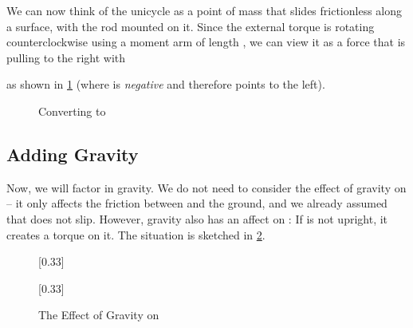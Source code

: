 \documentclass[copyright,submission]{eptcs}
\newcommand{\surface}{
    \begin{scope}[transparency group]
        \clip (-2,0) rectangle (2,-1);
        \draw[scope fading=south] (-2,0) rectangle (2,-1);
        \foreach \x in {-2,-1.75,...,3}
            \draw (\x,0) -- ();
    \end{scope}
}
\newcommand{\wheel}{
    \draw (0, 1) circle (1);
    \draw[fill] (0, 1) circle (0.05);
}
\newcommand{\saddle}[1][110]{
    \draw (0, 1) -- ([shift=(#1:3)] 0,1);
    \draw[fill] ([shift=(#1:0)] 0,1) circle (0.05);
    \draw[fill] ([shift=(#1:2)] 0,1) circle (0.03);
    \draw[fill] ([shift=(#1:3)] 0,1) circle (0.05);
}
\newcommand{\angletheta}[1][110]{
    \draw[dashed] (0, 1) -- (0, 3);
    \draw[dashed] ([shift=(90:1.5)] 0,1) arc (90:#1:1.5) node [midway, below] {};
}
\begin{document}
We can now think of the unicycle as a point of mass  that slides frictionless along a surface, with the rod  mounted on it. Since the external torque  is rotating  counterclockwise using a moment arm of length , we can view it as a force  that is pulling  to the right with

as shown in \cref{fig:torque-to-force} (where  is \emph{negative} and therefore points to the left).

\begin{figure}
    \centering{}
    \caption{\label{fig:torque-to-force} Converting  to }
\end{figure}


\subsection{Adding Gravity}

Now, we will factor in gravity. We do not need to consider the effect of gravity on  -- it only affects the friction between  and the ground, and we already assumed that  does not slip. However, gravity also has an affect on : If  is not upright, it creates a torque on it. The situation is sketched in \cref{fig:gravity-pull-on-s}.

\begin{figure}\centering
    [0.33\linewidth]{
        \centering{}
    }[0.33\linewidth]{
        \centering{}
    }
    \caption{\label{fig:gravity-pull-on-s} The Effect of Gravity on }
\end{figure}
\end{document}
